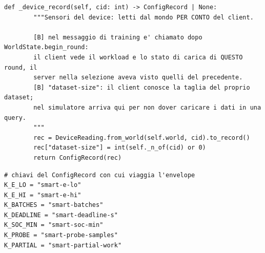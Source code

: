 \documentclass[11pt,a4paper]{article}
\begin{document}
\begin{lstlisting}[style=py,firstnumber=705,caption={\texttt{tesifl/strategies/sage\_smart.py}, lines 705--774}]
    def _device_record(self, cid: int) -> ConfigRecord | None:
        """Sensori del device: letti dal mondo PER CONTO del client.

        [B] nel messaggio di training e' chiamato dopo WorldState.begin_round:
        il client vede il workload e lo stato di carica di QUESTO round, il
        server nella selezione aveva visto quelli del precedente.
        [B] "dataset-size": il client conosce la taglia del proprio dataset;
        nel simulatore arriva qui per non dover caricare i dati in una query.
        """
        rec = DeviceReading.from_world(self.world, cid).to_record()
        rec["dataset-size"] = int(self._n_of(cid) or 0)
        return ConfigRecord(rec)
\end{lstlisting}

\begin{lstlisting}[style=py,firstnumber=54,caption={\texttt{tesifl/tesiFL/client\_policy.py}, lines 54--61}]
# chiavi del ConfigRecord con cui viaggia l'envelope
K_E_LO = "smart-e-lo"
K_E_HI = "smart-e-hi"
K_BATCHES = "smart-batches"
K_DEADLINE = "smart-deadline-s"
K_SOC_MIN = "smart-soc-min"
K_PROBE = "smart-probe-samples"
K_PARTIAL = "smart-partial-work"
\end{lstlisting}
\end{document}
